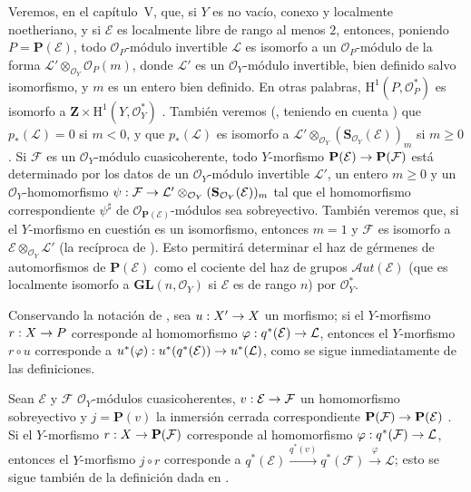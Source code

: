 \documentclass[oneside,10pt]{amsart}
\makeatletter
\renewcommand{\geq}{\geqslant}
\newcommand{\ega@arrow}[2]{\mathchoice{#1}{#2}{#2}{#2}}
\renewcommand{\to}{\ega@arrow{\longrightarrow}{\rightarrow}}
\newcommand{\oldpage}[2][]{\marginnote{\normalfont\footnotesize\textbf{#1}~|~#2}\ignorespaces}
\let\EGAOriginalLabel\label
\renewcommand{\label}[1]{\phantomsection\EGAOriginalLabel{#1}}
\makeatother
\begin{document}
\begin{remark}[4.2.7]
\label{II.4.2.7-fr}
Veremos, en el capítulo~V, que, si $Y$ es no vacío, conexo y localmente noetheriano, y si $\mathcal{E}$ es localmente libre de rango al menos $2$, entonces, poniendo $P=\mathbf{P}(\mathcal{E})$, todo $\mathcal{O}_P$-módulo invertible $\mathcal{L}$ es isomorfo a un $\mathcal{O}_P$-módulo de la forma $\mathcal{L}'\otimes_{\mathcal{O}_Y}\mathcal{O}_P(m)$, donde $\mathcal{L}'$ es un $\mathcal{O}_Y$-módulo invertible, bien definido salvo isomorfismo, y $m$ es un entero bien definido.
En otras palabras, $\mathrm{H}^1(P,\mathcal{O}_P^*)$ es isomorfo a $\mathbf{Z}\times\mathrm{H}^1(Y,\mathcal{O}_Y^*)$ .
También veremos (, teniendo en cuenta ) que $p_*(\mathcal{L})=0$ si $m<0$, y que $p_*(\mathcal{L})$ es isomorfo a $\mathcal{L}'\otimes_{\mathcal{O}_Y}
(\mathbf{S}_{\mathcal{O}_Y}(\mathcal{E}))_m$ si $m\geq0$.
Si $\mathcal{F}$ es un $\mathcal{O}_Y$-módulo cuasicoherente, todo $Y$-morfismo $\mathbf{P}(\mathcal{E})\to\mathbf{P}(\mathcal{F})$ está determinado por los datos de un $\mathcal{O}_Y$-módulo invertible $\mathcal{L}'$, un entero $m\geq0$ y un $\mathcal{O}_Y$-homomorfismo $\psi:\mathcal{F}\to\mathcal{L}'\otimes_{\mathcal{O}_Y}
(\mathbf{S}_{\mathcal{O}_Y}(\mathcal{E}))_m$ tal que el homomorfismo correspondiente $\psi^\sharp$ de $\mathcal{O}_{\mathbf{P}(\mathcal{E})}$-módulos sea sobreyectivo.
También veremos que, si el $Y$-morfismo en cuestión es un isomorfismo, entonces $m=1$ y $\mathcal{F}$ es isomorfo a $\mathcal{E}\otimes_{\mathcal{O}_Y}\mathcal{L}'$ (la recíproca de ).
Esto permitirá determinar el haz de gérmenes de automorfismos de $\mathbf{P}(\mathcal{E})$ como el cociente del haz de grupos $\mathcal{A}ut(\mathcal{E})$ (que es localmente isomorfo a $\mathbf{GL}(n,\mathcal{O}_Y)$ si $\mathcal{E}$ es de rango $n$) por $\mathcal{O}_Y^*$.
\end{remark}

\begin{env}[4.2.8]
\label{II.4.2.8-fr}
Conservando la notación de , sea $u:X'\to X$ un morfismo;
si el $Y$-morfismo $r:X\to P$ corresponde al homomorfismo $\varphi:q^*(\mathcal{E})\to\mathcal{L}$, entonces el $Y$-morfismo $r\circ u$ corresponde a $u^*(\varphi):u^*(q^*(\mathcal{E}))\to u^*(\mathcal{L})$, como se sigue inmediatamente de las definiciones.
\end{env}

\begin{env}[4.2.9]
\label{II.4.2.9-fr}
Sean $\mathcal{E}$ y $\mathcal{F}$ $\mathcal{O}_Y$-módulos cuasicoherentes, $v:\mathcal{E}\to\mathcal{F}$ un homomorfismo sobreyectivo y $j=\mathbf{P}(v)$ la inmersión cerrada correspondiente $\mathbf{P}(\mathcal{F})\to\mathbf{P}(\mathcal{E})$ .
Si el $Y$-morfismo $r:X\to\mathbf{P}(\mathcal{F})$ corresponde al homomorfismo $\varphi:q^*(\mathcal{F})\to\mathcal{L}$, entonces el
\oldpage[II]{76}
$Y$-morfismo $j\circ r$ corresponde a $q^*(\mathcal{E})\xrightarrow{q^*(v)}q^*(\mathcal{F})
\xrightarrow{\varphi}\mathcal{L}$;
esto se sigue también de la definición dada en .
\end{env}
\end{document}
